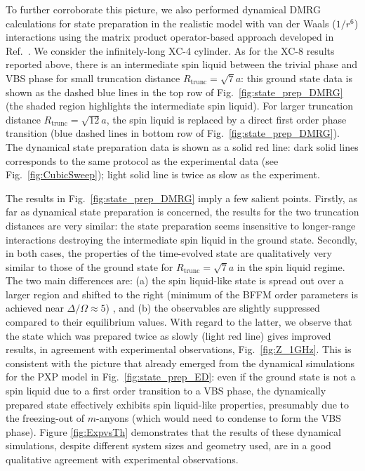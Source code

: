 \documentclass[twocolumn,amssymb,secnumarabic, prl, aps, nofootinbib]{revtex4-1}
\begin{document}
To further corroborate this picture, we also performed dynamical DMRG calculations for state preparation in the realistic model with van der Waals ($1/r^6$) interactions using the matrix product operator-based approach developed in Ref.~\cite{Zaletel15}. We consider the infinitely-long XC-4 cylinder. As for the XC-8 results reported above, there is an intermediate spin liquid between the trivial phase and VBS phase for small truncation distance $R_\textrm{trunc} = \sqrt{7}a$: this ground state data is shown as the dashed blue lines in the top row of Fig.~\ref{fig:state_prep_DMRG} (the shaded region highlights the intermediate spin liquid). For larger truncation distance $R_\textrm{trunc}=\sqrt{12}a$, the spin liquid is replaced by a direct first order phase transition (blue dashed lines in bottom row of Fig.~\ref{fig:state_prep_DMRG}). The dynamical state preparation data is shown as a solid red line: dark solid lines corresponds to the same protocol as the experimental data (see Fig.~\ref{fig:CubicSweep}); light solid line is twice as slow as the experiment.

The results in Fig.~\ref{fig:state_prep_DMRG} imply a few salient points. Firstly, as far as dynamical state preparation is concerned, the results for the two truncation distances are very similar: the state preparation seems insensitive to longer-range interactions destroying the intermediate spin liquid in the ground state. Secondly, in both cases, the properties of the time-evolved state are qualitatively very similar to those of the ground state for $R_\textrm{trunc}=\sqrt{7}a$ in the spin liquid regime. The two main differences are: (a) the spin liquid-like state is spread out over a larger region and shifted to the right (minimum of the BFFM order parameters is achieved near $\Delta/\Omega \approx 5$) , and (b) the observables are slightly suppressed compared to their equilibrium values. With regard to the latter, we observe  that the state which was prepared twice as slowly (light red line) gives improved results, in agreement with experimental observations, Fig.~\ref{fig:Z_1GHz}.  This is consistent with the picture that already emerged from the dynamical simulations for the PXP model in Fig.~\ref{fig:state_prep_ED}: even if the ground state is not a spin liquid due to a first order transition to a VBS phase, the dynamically prepared state effectively exhibits spin liquid-like properties, presumably due to the freezing-out of $m$-anyons (which would need to condense to form the VBS phase). Figure \ref{fig:ExpvsTh} demonstrates 
that the results of these dynamical simulations, despite different system sizes and geometry used, are in a  good qualitative agreement with experimental observations. 
\end{document}

